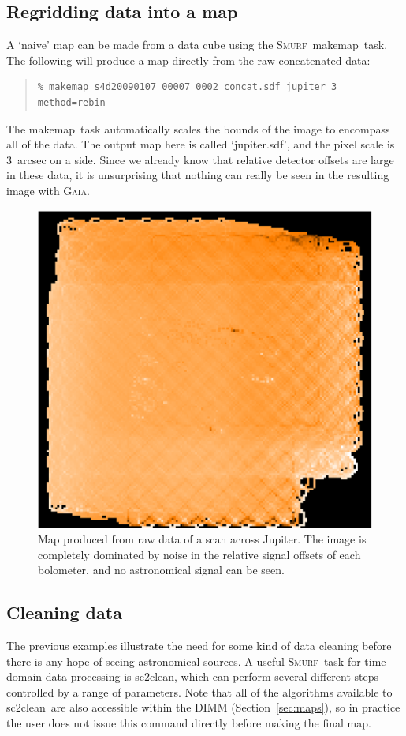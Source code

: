 \documentclass[twoside,11pt]{article}
\newenvironment{myquote}{\begin{quote}\begin{small}}{\end{small}\end{quote}}
\newcommand{\gaia}{\xref{\textsc{Gaia}}{sun214}{}}
\newcommand{\smurf}{\xref{\textsc{Smurf}}{sun258}{}}
\newcommand{\task}[1]{\textsf{#1}}
\newcommand{\clean}{\xref{\task{sc2clean}}{sun258}{SC2CLEAN}}
\newcommand{\makemap}{\xref{\task{makemap}}{sun258}{MAKEMAP}}
\newcommand{\xref}[3]{#1}
\newcommand{\xlabel}[1]{}
\renewcommand{\_}{\texttt{\symbol{95}}}
\begin{document}
\subsection{\xlabel{regrid_map}Regridding data into a map} 

A `naive' map can be made from a data cube using the \smurf\ \makemap\
task. The following will produce a map directly from the raw
concatenated data:

\begin{myquote}
\begin{verbatim}
% makemap s4d20090107_00007_0002_concat.sdf jupiter 3 method=rebin
\end{verbatim}
\end{myquote}

The \makemap\ task automatically scales the bounds of the image to
encompass all of the data. The output map here is called
`jupiter.sdf', and the pixel scale is 3~arcsec on a side. Since we
already know that relative detector offsets are large in these data,
it is unsurprising that nothing can really be seen in the resulting
image with \gaia.

\begin{figure}
\begin{center}
\includegraphics[width=0.5\linewidth]{rawmap}
\caption{Map produced from raw data of a scan across Jupiter. The
  image is completely dominated by noise in the relative signal
  offsets of each bolometer, and no astronomical signal can be seen.}
\label{fig:rawmap}
\end{center}
\end{figure}

\subsection{\xlabel{clean}Cleaning data} 

The previous examples illustrate the need for some kind of data
cleaning before there is any hope of seeing astronomical sources. A
useful \smurf\ task for time-domain data processing is \clean, which
can perform several different steps controlled by a range of
parameters. Note that all of the algorithms available to \clean\ are
also accessible within the DIMM (Section~\ref{sec:maps}), so in
practice the user does not issue this command directly before making
the final map.
\end{document}
